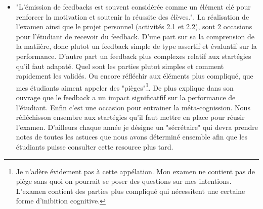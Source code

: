 \begin{itemize}
    \item "L’émission de feedbacks est souvent considérée comme un élément clé pour renforcer la motivation et soutenir la réussite des élèves."\cite{georges2011feedbacks}. La réalisation de l'examen ainsi que le projet personnel (activités 2.1 et 2.2), sont 2 occasions pour l'étudiant de recevoir du feedback. D'une part sur sa la comprension de la matiière, donc plutot un feedback simple de type assertif et évaluatif \cite{georges2011feedbacks} sur la performance. D'autre part un feedback plus complexes relatif aux startégies qu'il faut adapaté. Quel sont les parties plutot simples et comment rapidement les validés. Ou encore réfléchir aux éléments plus compliqué, que mes étudiants aiment appeler des "pièges"\footnote{Je n'adère évidement pas à cette appélation. Mon examen ne contient pas de piège sans quoi on pourrait se poser des questions sur mes intentions. L'examen contient des parties plus compliqué qui nécessitent une certaine forme d'inibition cognitive.}. De plus \citep{hattie2008visible} explique dans son ouvrage que le feedback a un impact significatfif sur la performance de l'étudiant. Enfin c'est une occasion pour entrainer la méta-cognission\cite{leclercq2008modele}. Nous réfléchisson ensembre aux startégies qu'il faut mettre en place pour réusir l'examen. D'ailleurs chaque année je désigne un "sécrétaire" qui devra prendre notes de toutes les astuces que nous avons déterminé ensemble afin que les étudiants puisse consulter cette resource plus tard.
\end{itemize}



\clearpage
\printbibliography


